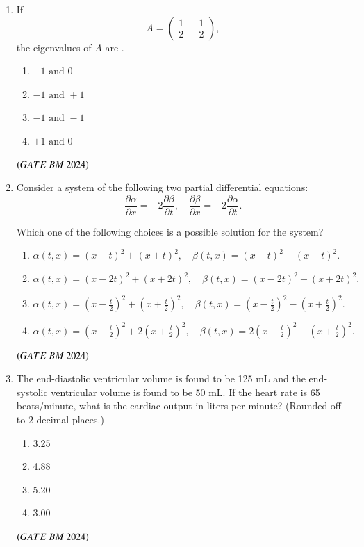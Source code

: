 \documentclass[journal,12pt,onecolumn]{IEEEtran}
\theoremstyle{remark}
\begin{document}
\begin{enumerate}
 \item If 
\[
A = \begin{pmatrix}
1 & -1 \\
2 & -2
\end{pmatrix},
\]
the eigenvalues of $A$ are \underline{\hspace{2cm}}.
\begin{enumerate}[label=(\Alph*)]
    \item $-1 \text{ and } 0$
    \item $-1 \text{ and } +1$
    \item $-1 \text{ and } -1$
    \item $+1 \text{ and } 0$
\end{enumerate}
\hfill $\brak{GATE\ BM\ 2024}$

\item Consider a system of the following two partial differential equations:
\[
\frac{\partial \alpha}{\partial x} = -2 \frac{\partial \beta}{\partial t},
\quad
\frac{\partial \beta}{\partial x} = -2 \frac{\partial \alpha}{\partial t}.
\]

Which one of the following choices is a possible solution for the system?

\begin{enumerate}[label=(\Alph*)]
    \item $\alpha(t,x) = (x-t)^2 + (x+t)^2, \quad 
          \beta(t,x) = (x-t)^2 - (x+t)^2.$
          
    \item $\alpha(t,x) = (x-2t)^2 + (x+2t)^2, \quad 
          \beta(t,x) = (x-2t)^2 - (x+2t)^2.$
          
    \item $\alpha(t,x) = \left(x - \tfrac{t}{2}\right)^2 + \left(x + \tfrac{t}{2}\right)^2, \quad 
          \beta(t,x) = \left(x - \tfrac{t}{2}\right)^2 - \left(x + \tfrac{t}{2}\right)^2.$
          
    \item $\alpha(t,x) = \left(x - \tfrac{t}{2}\right)^2 + 2\left(x + \tfrac{t}{2}\right)^2, \quad 
          \beta(t,x) = 2\left(x - \tfrac{t}{2}\right)^2 - \left(x + \tfrac{t}{2}\right)^2.$
\end{enumerate}
\hfill $\brak{GATE\ BM\ 2024}$

\item The end-diastolic ventricular volume is found to be 125 mL and the end-systolic
ventricular volume is found to be 50 mL. If the heart rate is 65 beats/minute, what is
the cardiac output in liters per minute? (Rounded off to 2 decimal places.)
\begin{enumerate}[label=(\Alph*)]
    \item 3.25
    \item 4.88
    \item 5.20
    \item 3.00
\end{enumerate}
\hfill $\brak{GATE\ BM\ 2024}$


\end{enumerate}
\end{document}
